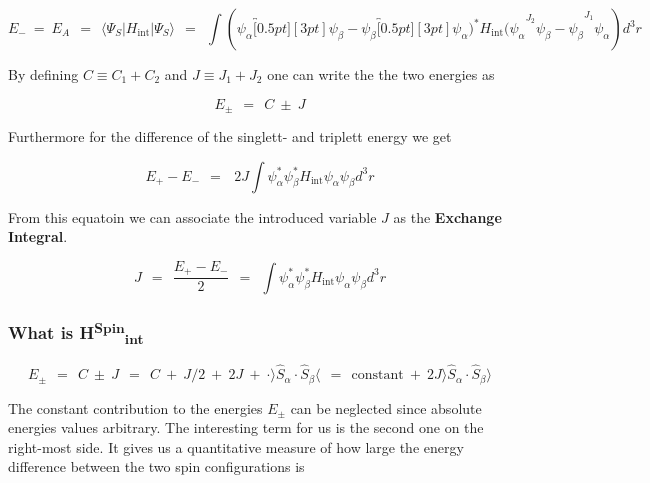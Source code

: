 \documentclass[10pt]{report}
\numberwithin{equation}{chapter}
\begin{document}
\begin{equation}
  E_- ~=~E_A ~~=~~ \langle \Psi_S | H_\text{int} | \Psi_S \rangle ~~=~~
  \int ( \psi_\alpha \overbracket[0.5pt][3pt]{ \psi_\beta - \psi_\beta \overbracket[0.5pt][3pt]{ \psi_\alpha )^* H_\text{int} 
  ( \psi_\alpha }^{J_2} \psi_\beta - \psi_\beta}^{J_1} \psi_\alpha ) d^3r
\end{equation}


By defining $C \equiv C_1+C_2$ and $J \equiv J_1+J_2$ one can write the the two energies as

\begin{equation}
  E_\pm ~~=~~ C ~\pm~ J
\end{equation}

Furthermore for the difference of the singlett- and triplett energy we get

\begin{equation}
  E_+ - E_- ~~=~~~2J \int \psi^*_\alpha \psi^*_\beta H_\text{int} \psi_\alpha \psi_\beta d^3r
\end{equation}

From this equatoin we can associate the introduced variable $J$ as the \textbf{Exchange Integral}.

\begin{equation}
  J ~~=~~ \frac{E_+-E_-}{2} ~~=~~ \int \psi^*_\alpha \psi^*_\beta H_\text{int} \psi_\alpha \psi_\beta d^3r
\end{equation}


\subsubsection{What is H\textsuperscript{Spin}\textsubscript{int}}

\begin{equation}
  E_\pm ~~=~~ C ~\pm~ J ~~=~~ C ~+~ J/2 ~+~ 2J ~+~ \cdot \rangle \hat{S}_\alpha \cdot \hat{S}_\beta \langle ~~=~~ \text{constant} ~+~ 2J \rangle \hat{S}_\alpha \cdot \hat{S}_\beta \rangle
\end{equation}

The constant contribution to the energies $E_\pm$ can be neglected since absolute energies values arbitrary. The interesting term for us is the second one on the right-most side. It gives us a quantitative measure of how large the energy difference between the two spin configurations is
\end{document}
